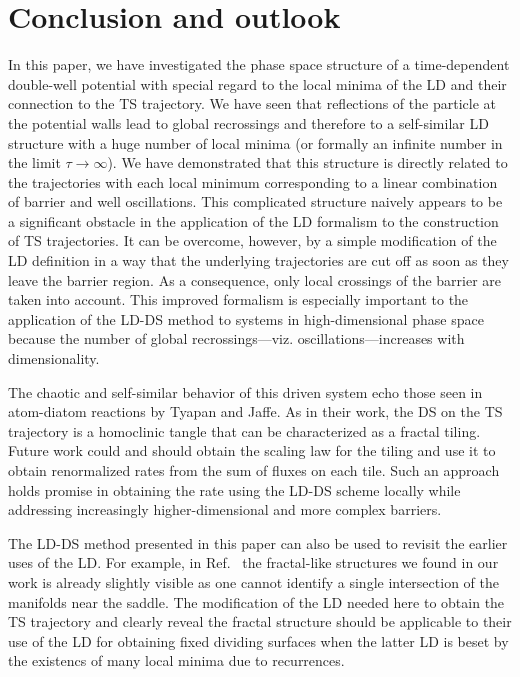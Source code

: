 \documentclass[aip,reprint,jcp,amsmath,amssymb,superscriptaddress,floatfix]{revtex4-1}
\def\EDITS#1{{\color{green}#1}}
\def\EDITS#1{#1}
\def\EDITS#1{{\color{mygreen}#1}}
\begin{document}
\section{Conclusion and outlook}

In this paper, we have investigated the phase space structure of a 
time-dependent double-well potential with special regard to the local minima of 
the LD and their connection to the TS trajectory.
We have seen that reflections of the particle at the potential walls lead 
to global recrossings and therefore to a 
self-similar LD structure with a huge number of local minima (or formally an 
infinite number in the limit $\tau\to\infty$).
We have demonstrated that this structure is directly related to the 
trajectories with
each local minimum corresponding 
to a linear combination of 
barrier and well oscillations.
This complicated structure naively
appears to be a significant obstacle in 
the application of the LD formalism to the
construction of TS trajectories.
It can be overcome, however,  
by a simple modification of the LD definition in a way that the 
underlying trajectories are cut off as soon as they leave the barrier region.
As a consequence, only local crossings of the barrier are taken into account.
This improved formalism is especially important to the application of the 
LD-DS method to systems 
in high-dimensional phase space
because the number of global recrossings---viz. oscillations---increases
with dimensionality.

The chaotic and self-similar behavior of this driven system 
echo those seen in atom-diatom reactions by
Tyapan and Jaffe.\cite{jaffe94,jaffe95}
As in their work, the DS on the TS trajectory is a homoclinic tangle that 
can be characterized as a fractal tiling.
Future work could and should obtain the scaling law for the tiling and
use it to obtain renormalized rates from the sum of fluxes on each tile.
Such an approach holds promise in obtaining the rate using the LD-DS scheme
locally while addressing increasingly higher-dimensional and more complex
barriers.

\EDITS{The LD-DS method presented 
in this paper can also be used to revisit the earlier
uses of the LD.
For example, in Ref.~\cite{Mancho2013} the fractal-like structures 
we found in our work
is already slightly visible as one cannot identify a single intersection 
of the manifolds near the saddle. 
The modification of the LD needed here to obtain
the TS trajectory and clearly reveal the fractal structure
should be applicable to their use of the LD for obtaining 
fixed dividing surfaces
when the latter LD is beset by the existencs of many local minima due
to recurrences.
}
\end{document}
